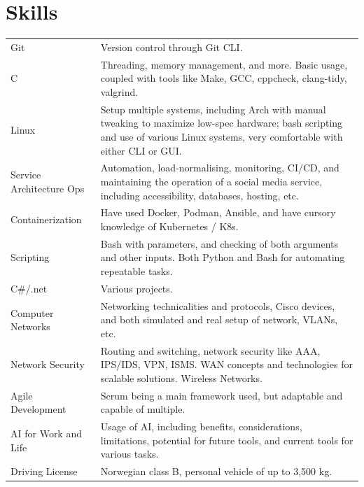 \documentclass[a4paper,12pt]{article}
\begin{document}
\section{Skills}
\begin{tabularx}{\linewidth}{@{}l X@{}}
Git &  \normalsize{Version control through Git CLI.}\\
C &    \normalsize{Threading, memory management, and more. Basic usage, coupled with tools like Make, GCC, cppcheck, clang-tidy, valgrind.}\\ 
Linux &  \normalsize{Setup multiple systems, including Arch with manual tweaking to maximize low-spec hardware; bash scripting and use of various Linux systems, very comfortable with either CLI or GUI.}\\
Service Architecture Ops &  \normalsize{Automation, load-normalising, monitoring, CI/CD, and maintaining the operation of a social media service, including accessibility, databases, hosting, etc.}\\
Containerization &  \normalsize{Have used Docker, Podman, Ansible, and have cursory knowledge of Kubernetes / K8s.}\\
Scripting &         \normalsize{Bash with parameters, and checking of both arguments and other inputs. Both Python and Bash for automating repeatable tasks.}\\
C\#/.net  &  \normalsize{Various projects.}\\ 
Computer Networks &  \normalsize{Networking technicalities and protocols, Cisco devices, and both simulated and real setup of network, VLANs, etc.}\\
Network Security &  \normalsize{Routing and switching, network security like AAA, IPS/IDS, VPN, ISMS. WAN concepts and technologies for scalable solutions. Wireless Networks.}\\ 
Agile Development &  \normalsize{Scrum being a main framework used, but adaptable and capable of multiple.}\\ 
AI for Work and Life &   \normalsize{Usage of AI, including benefits, considerations, limitations, potential for future tools, and current tools for various tasks.}\\
Driving License &  \normalsize{Norwegian class B, personal vehicle of up to 3,500 kg.}
\end{tabularx}


\vfill
{}
\end{document}
